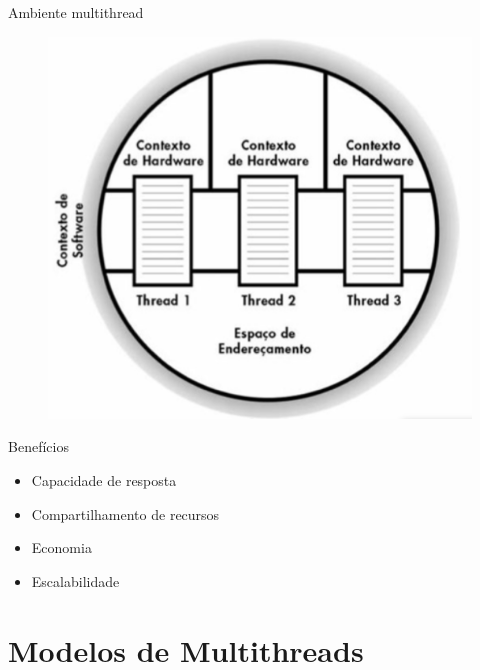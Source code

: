 \documentclass[aspectratio=169,
				xcolor=table]{beamer}
\begin{document}
	\begin{frame}{Ambiente multithread}
		\begin{figure}[hbtp]
			\centering
			\includegraphics[height=.85\textheight, keepaspectratio]{../figs/cap04/multithread02.png}
		\end{figure}	
	\end{frame}	
	
	\begin{frame}{Benefícios}
		\begin{itemize}
			\item Capacidade de resposta
			\vspace{1em}
			\item Compartilhamento de recursos
			\vspace{1em}
			\item Economia
			\vspace{1em}
			\item Escalabilidade
		\end{itemize}
	\end{frame}
	
	\section{Modelos de Multithreads}
	
\end{document}
